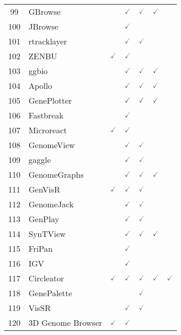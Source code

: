\documentclass[10pt,letterpaper]{article}
\begin{document}
\begin{table}[!ht]
\begin{adjustwidth}{-2.25in}{0in}
\begin{tabular}{|c|l|c|c|c|c|c|}
99 & GBrowse\cite{donlin2009using} & & $\checked$ & $\checked$ & $\checked$ & \\ 
100 & JBrowse\cite{skinner2009jbrowse} & & $\checked$ & & & \\ 
101 & rtracklayer\cite{lawrence2009rtracklayer} & & $\checked$ & $\checked$ & & \\ 
102 & ZENBU\cite{severin2014interactive} & $\checked$ & $\checked$ & & & \\ 
103 & ggbio\cite{yin2012ggbio} & & $\checked$ & $\checked$ & $\checked$ & \\ 
104 & Apollo\cite{lee2009apollo} & & $\checked$ & $\checked$ & $\checked$ & \\ 
105 & GenePlotter\cite{humburg2012using} & & $\checked$ & $\checked$ & $\checked$ & \\ 
106 & Fastbreak\cite{bressler2012fastbreak} & & $\checked$ & & & \\ 
107 & Microreact\cite{argimon2016microreact} & $\checked$ & $\checked$ & & & \\ 
108 & GenomeView\cite{abeel2011genomeview} & & $\checked$ & $\checked$ & & \\ 
109 & gaggle\cite{shannon2006gaggle} & & $\checked$ & $\checked$ & & \\ 
110 & GenomeGraphs\cite{durinck2009genomegraphs} & & $\checked$ & $\checked$ & $\checked$ & \\ 
111 & GenVisR\cite{skidmore2016genvisr} & $\checked$ & $\checked$ & $\checked$ & & \\ 
112 & GenomeJack\cite{satoh2013molecular} & & $\checked$ & $\checked$ & & \\ 
113 & GenPlay\cite{lajugie2011genplay} & & $\checked$ & $\checked$ & & \\ 
114 & SynTView\cite{lechat2013syntview} & & $\checked$ & $\checked$ & $\checked$ & \\ 
115 & FriPan\cite{exner1985quantitative} & & $\checked$ & & & \\ 
116 & IGV\cite{thorvaldsdottir2013integrative} & & $\checked$ & & & \\ 
117 & Circleator\cite{crabtree2014circleator} & $\checked$ & $\checked$ & $\checked$ & $\checked$ & $\checked$  \\ 
118 & GenePalette\cite{rebeiz2004genepalette} & & & $\checked$ & & \\ 
119 & VisSR\cite{chesters1983low} & & $\checked$ & $\checked$ & & \\ 
120 & 3D Genome Browser\cite{butyaev2015low} & $\checked$ & $\checked$ & & & \\ 

\end{tabular}
\end{adjustwidth}
\end{table}
\end{document}

